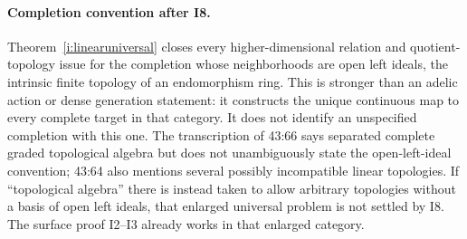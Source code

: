 \paragraph{Completion convention after I8.}
Theorem~\ref{i:linearuniversal} closes every higher-dimensional
relation and quotient-topology issue for the completion whose
neighborhoods are open left ideals, the intrinsic finite topology of
an endomorphism ring. This is stronger than an adelic action or dense
generation statement: it constructs the unique continuous map to
every complete target in that category. It does not identify an
unspecified completion with this one. The transcription of 43:66
says separated complete graded topological algebra but does not
unambiguously state the open-left-ideal convention; 43:64 also
mentions several possibly incompatible linear topologies. If
``topological algebra'' there is instead taken to allow arbitrary
topologies without a basis of open left ideals, that enlarged
universal problem is not settled by I8. The surface proof I2--I3
already works in that enlarged category.



